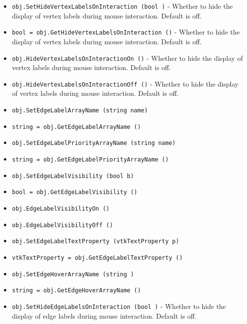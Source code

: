 \begin{itemize}
\item  \verb|obj.SetHideVertexLabelsOnInteraction (bool )| -  Whether to hide the display of vertex labels during mouse interaction.  Default is off.

\item  \verb|bool = obj.GetHideVertexLabelsOnInteraction ()| -  Whether to hide the display of vertex labels during mouse interaction.  Default is off.

\item  \verb|obj.HideVertexLabelsOnInteractionOn ()| -  Whether to hide the display of vertex labels during mouse interaction.  Default is off.

\item  \verb|obj.HideVertexLabelsOnInteractionOff ()| -  Whether to hide the display of vertex labels during mouse interaction.  Default is off.

\item  \verb|obj.SetEdgeLabelArrayName (string name)|

\item  \verb|string = obj.GetEdgeLabelArrayName ()|

\item  \verb|obj.SetEdgeLabelPriorityArrayName (string name)|

\item  \verb|string = obj.GetEdgeLabelPriorityArrayName ()|

\item  \verb|obj.SetEdgeLabelVisibility (bool b)|

\item  \verb|bool = obj.GetEdgeLabelVisibility ()|

\item  \verb|obj.EdgeLabelVisibilityOn ()|

\item  \verb|obj.EdgeLabelVisibilityOff ()|

\item  \verb|obj.SetEdgeLabelTextProperty (vtkTextProperty p)|

\item  \verb|vtkTextProperty = obj.GetEdgeLabelTextProperty ()|

\item  \verb|obj.SetEdgeHoverArrayName (string )|

\item  \verb|string = obj.GetEdgeHoverArrayName ()|

\item  \verb|obj.SetHideEdgeLabelsOnInteraction (bool )| -  Whether to hide the display of edge labels during mouse interaction.  Default is off.


\end{itemize}
